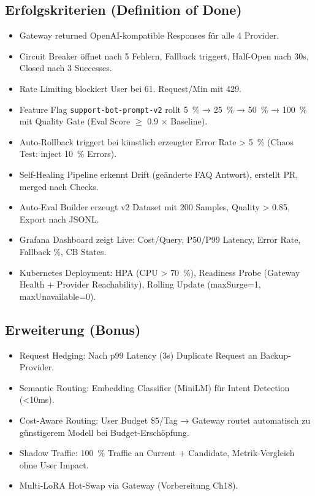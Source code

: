 \subsection*{Erfolgskriterien (Definition of Done)}

\begin{itemize}
    \item \checkmark Gateway returned OpenAI-kompatible Responses für alle 4 Provider.
    \item \checkmark Circuit Breaker öffnet nach 5 Fehlern, Fallback triggert, Half-Open nach 30s, Closed nach 3 Successes.
    \item \checkmark Rate Limiting blockiert User bei 61. Request/Min mit 429.
    \item \checkmark Feature Flag \texttt{support-bot-prompt-v2} rollt 5~\% → 25~\% → 50~\% → 100~\% mit Quality Gate (Eval Score $\ge$ 0.9 × Baseline).
    \item \checkmark Auto-Rollback triggert bei künstlich erzeugter Error Rate > 5~\% (Chaos Test: inject 10~\% Errors).
    \item \checkmark Self-Healing Pipeline erkennt Drift (geänderte FAQ Antwort), erstellt PR, merged nach Checks.
    \item \checkmark Auto-Eval Builder erzeugt v2 Dataset mit 200 Samples, Quality > 0.85, Export nach JSONL.
    \item \checkmark Grafana Dashboard zeigt Live: Cost/Query, P50/P99 Latency, Error Rate, Fallback \%, CB States.
    \item \checkmark Kubernetes Deployment: HPA (CPU > 70~\%), Readiness Probe (Gateway Health + Provider Reachability), Rolling Update (maxSurge=1, maxUnavailable=0).
\end{itemize}

\subsection*{Erweiterung (Bonus)}

\begin{itemize}
    \item Request Hedging: Nach p99 Latency (3s) Duplicate Request an Backup-Provider.
    \item Semantic Routing: Embedding Classifier (MiniLM) für Intent Detection (<10ms).
    \item Cost-Aware Routing: User Budget \$5/Tag → Gateway routet automatisch zu günstigerem Modell bei Budget-Erschöpfung.
    \item Shadow Traffic: 100~\% Traffic an Current + Candidate, Metrik-Vergleich ohne User Impact.
    \item Multi-LoRA Hot-Swap via Gateway (Vorbereitung Ch18).
\end{itemize}

